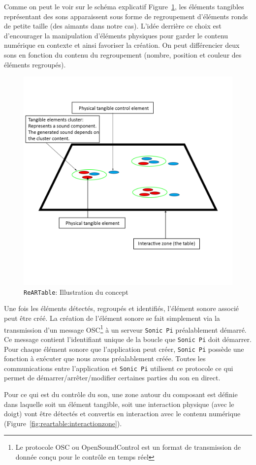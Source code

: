 Comme on peut le voir sur le schéma explicatif Figure~\ref{fig:reartable:generalscheme}, les éléments tangibles représentant des sons apparaissent sous forme de regroupement d'éléments ronds de petite taille (des aimants dans notre cas). L'idée derrière ce choix est d'encourager la manipulation d'éléments physiques pour garder le contenu numérique en contexte et ainsi favoriser la création. On peut différencier deux sons en fonction du contenu du regroupement (nombre, position et couleur des éléments regroupés).

\begin{figure}[H]
\centering
\includegraphics[width=0.5\linewidth]{images/rearproto}
\caption{\texttt{ReARTable}: Illustration du concept}
\label{fig:reartable:generalscheme}
\end{figure}

Une fois les éléments détectés, regroupés et identifiés, l'élément sonore associé peut être créé. La création de l'élément sonore se fait simplement via la transmission d'un message OSC\footnote{Le protocole OSC ou OpenSoundControl est un format de transmission de donnée conçu pour le contrôle en temps réel} à un serveur \texttt{Sonic Pi} préalablement démarré. Ce message contient l'identifiant unique de la boucle que \texttt{Sonic Pi} doit démarrer. Pour chaque élément sonore que l'application peut créer, \texttt{Sonic Pi} possède une fonction à exécuter que nous avons préalablement créée. Toutes les communications entre l'application et \texttt{Sonic Pi} utilisent ce protocole ce qui permet de démarrer/arrêter/modifier certaines parties du son en direct.

Pour ce qui est du contrôle du son, une zone autour du composant est définie dans laquelle soit un élément tangible, soit une interaction physique (avec le doigt) vont être détectés et convertis en interaction avec le contenu numérique (Figure~\ref{fig:reartable:interactionzone}).


